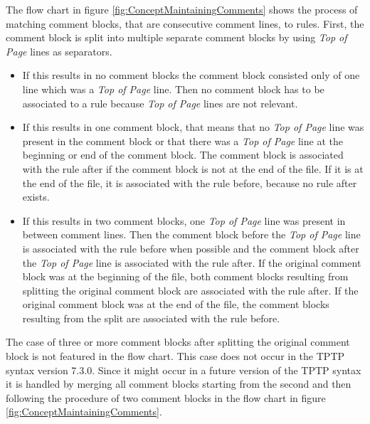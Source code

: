 The flow chart in figure \ref{fig:ConceptMaintainingComments} shows the process of matching comment blocks, that are consecutive comment lines,  to rules.
First, the comment block is split into multiple separate comment blocks by using \textit{Top of Page} lines as separators.
\begin{itemize}%
	\item If this results in no comment blocks the comment block consisted only of one line which was a \textit{Top of Page} line.
	Then no comment block has to be associated to a rule because \textit{Top of Page} lines are not relevant.
	\item If this results in one comment block, that means that no \textit{Top of Page} line was present in the comment block or that there was a \textit{Top of Page} line at the beginning or end of the comment block. The comment block is associated with the rule after if the comment block is not at the end of the file.
	If it is at the end of the file, it is associated with the rule before, because no rule after exists.
	\item If this results in two comment blocks, one \textit{Top of Page} line was present in between comment lines.
	Then the comment block before the \textit{Top of Page} line is associated with the rule before when possible and the comment block after the \textit{Top of Page} line is associated with the rule after.
	If the original comment block was at the beginning of the file, both comment blocks resulting from splitting the original comment block are associated with the rule after.
	If the original comment block was at the end of the file, the comment blocks resulting from the split are associated with the rule before.
\end{itemize}
The case of three or more comment blocks after splitting the original comment block is not featured in the flow chart.
This case does not occur in the \ac{TPTP} syntax version 7.3.0.
Since it might occur in a future version of the \ac{TPTP} syntax it is handled by merging all comment blocks starting from the second and then following the procedure of two comment blocks in the flow chart in figure \ref{fig:ConceptMaintainingComments}.

